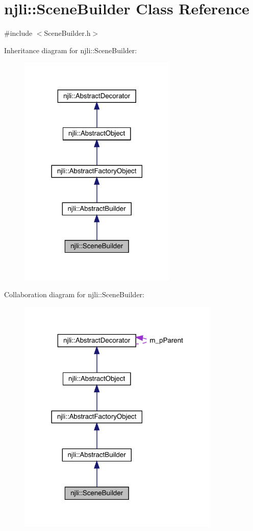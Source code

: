 \hypertarget{classnjli_1_1_scene_builder}{}\section{njli\+:\+:Scene\+Builder Class Reference}
\label{classnjli_1_1_scene_builder}


{\ttfamily \#include $<$Scene\+Builder.\+h$>$}



Inheritance diagram for njli\+:\+:Scene\+Builder\+:\nopagebreak
\begin{figure}[H]
\begin{center}
\leavevmode
\includegraphics[width=213pt]{classnjli_1_1_scene_builder__inherit__graph}
\end{center}
\end{figure}


Collaboration diagram for njli\+:\+:Scene\+Builder\+:\nopagebreak
\begin{figure}[H]
\begin{center}
\leavevmode
\includegraphics[width=273pt]{classnjli_1_1_scene_builder__coll__graph}
\end{center}
\end{figure}
